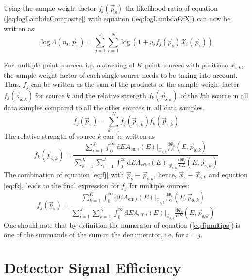 \documentclass{article}
\newcommand{\eq}[1]{(\ref{#1})}
\newcommand{\ns}{n_{\mathrm{s}}}
\newcommand{\ps}{\vec{p}_{\mathrm{s}}}
\newcommand{\xs}{\vec{x}_{\mathrm{s}}}
\newcommand{\dPhisdE}{\frac{\mathrm{d}\Phi_{\mathrm{s}}}{\mathrm{d}E}}
\begin{document}
Using the sample weight factor $f_{j}(\ps)$ the likelihood ratio of
equation \eq{eq:logLambdaComposite} with equation \eq{eq:logLambdaOfX} can now
be written as
\begin{equation}
 \log \Lambda(\ns,\ps) = \sum_{j=1}^{J} \sum_{i=1}^{N} \log (1 + \ns f_{j}(\ps)\mathcal{X}_i(\ps))
\end{equation}


For multiple point sources, i.e. a stacking of $K$ point sources with positions
$\vec{x}_{\mathrm{s},k}$, the sample weight factor of each single source needs
to be taking into account. Thus, $f_{j}$ can be written as the sum of the
products of the sample weight factor $f_{j}(\vec{p}_{\mathrm{s},k})$ for
source $k$ and the relative strength $f_{k}(\vec{p}_{\mathrm{s},k})$ of the
$k$th source in all data samples compared to all the other sources in all data
samples.
\begin{equation}
 f_{j}(\ps) = \sum_{k=1}^{K} f_{j}(\vec{p}_{\mathrm{s},k}) f_{k}(\vec{p}_{\mathrm{s},k})
\end{equation}
The relative strength of source $k$ can be written as
\begin{equation}
 f_{k}(\vec{p}_{\mathrm{s},k}) =
    \frac{\sum_{i=1}^{J} \int_0^\infty \mathrm{d}E A_{\mathrm{eff},i}(E)|_{\vec{x}_{\mathrm{s},k}} \dPhisdE(E,\vec{p}_{\mathrm{s},k})}
         {\sum_{\kappa=1}^{K} \sum_{i=1}^{J} \int_0^\infty \mathrm{d}E A_{\mathrm{eff},i}(E)|_{\vec{x}_{\mathrm{s},\kappa}} \dPhisdE(E,\vec{p}_{\mathrm{s},k}) }
 \label{eq:fk}
\end{equation}
The combination of equation \ref{eq:fj} with $\ps \equiv \vec{p}_{\mathrm{s},k}$, hence,
$\xs \equiv \vec{x}_{\mathrm{s},k}$ and equation
\ref{eq:fk}, leads to the final expression for $f_{j}$ for multiple sources:
\begin{equation}
 f_{j}(\ps) =
    \frac{\sum_{k=1}^{K} \int_0^\infty \mathrm{d}E A_{\mathrm{eff},j}(E)|_{\vec{x}_{\mathrm{s},k}} \dPhisdE(E,\vec{p}_{\mathrm{s},k}) }
         {\sum_{i=1}^{J} \sum_{k=1}^{K} \int_0^\infty \mathrm{d}E A_{\mathrm{eff},i}(E)|_{\vec{x}_{\mathrm{s},k}} \dPhisdE(E,\vec{p}_{\mathrm{s},k}) }
 \label{eq:fjmultips}
\end{equation}
One should note that by definition the numerator of equation \eq{eq:fjmultips}
is one of the summands of the sum in the denumerator, i.e. for $i=j$.


\section{Detector Signal Efficiency}
\end{document}
